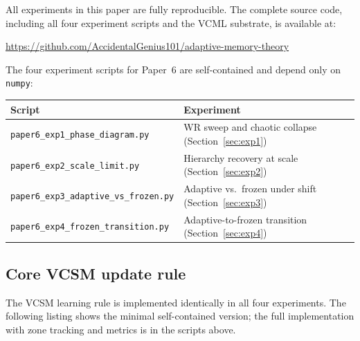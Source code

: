 \documentclass[12pt]{article}
\begin{document}
All experiments in this paper are fully reproducible. The complete source code, including all four experiment scripts and the VCML substrate, is available at:

\begin{center}
\url{https://github.com/AccidentalGenius101/adaptive-memory-theory}
\end{center}

The four experiment scripts for Paper~6 are self-contained and depend only on \texttt{numpy}:
\begin{center}
\begin{tabular}{ll}
\toprule
\textbf{Script} & \textbf{Experiment} \\
\midrule
\texttt{paper6\_exp1\_phase\_diagram.py} & WR sweep and chaotic collapse (Section~\ref{sec:exp1}) \\
\texttt{paper6\_exp2\_scale\_limit.py}   & Hierarchy recovery at scale (Section~\ref{sec:exp2}) \\
\texttt{paper6\_exp3\_adaptive\_vs\_frozen.py} & Adaptive vs.\ frozen under shift (Section~\ref{sec:exp3}) \\
\texttt{paper6\_exp4\_frozen\_transition.py}   & Adaptive-to-frozen transition (Section~\ref{sec:exp4}) \\
\bottomrule
\end{tabular}
\end{center}

\subsection*{Core VCSM update rule}

The VCSM learning rule is implemented identically in all four experiments. The following listing shows the minimal self-contained version; the full implementation with zone tracking and metrics is in the scripts above.
\end{document}
